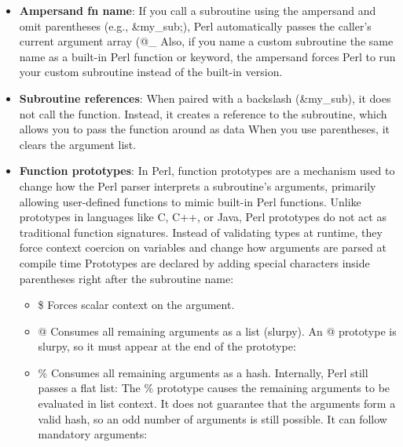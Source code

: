 \documentclass{report}
\begin{document}
\begin{itemize}
        \item \textbf{Ampersand fn name}: If you call a subroutine using the ampersand and omit parentheses (e.g., \&my\_sub;), Perl automatically passes the caller's current argument array (@\_
            \bigbreak \noindent 
            Also, if you name a custom subroutine the same name as a built-in Perl function or keyword, the ampersand forces Perl to run your custom subroutine instead of the built-in version.
        \item \textbf{Subroutine references}: When paired with a backslash (\&my\_sub), it does not call the function. Instead, it creates a reference to the subroutine, which allows you to pass the function around as data
            \bigbreak \noindent 
            When you use parentheses, it clears the argument list.
        \item \textbf{Function prototypes}: In Perl, function prototypes are a mechanism used to change how the Perl parser interprets a subroutine's arguments, primarily allowing user-defined functions to mimic built-in Perl functions.
            \bigbreak \noindent 
            Unlike prototypes in languages like C, C++, or Java, Perl prototypes do not act as traditional function signatures. Instead of validating types at runtime, they force context coercion on variables and change how arguments are parsed at compile time
            \bigbreak \noindent 
            Prototypes are declared by adding special characters inside parentheses right after the subroutine name:
            \begin{itemize}
                \item \$ Forces scalar context on the argument.
                \item @ Consumes all remaining arguments as a list (slurpy).
                    \bigbreak \noindent 
                    An @ prototype is slurpy, so it must appear at the end of the prototype:
                \item \% Consumes all remaining arguments as a hash.
                    \bigbreak \noindent 
                    Internally, Perl still passes a flat list:
                    \bigbreak \noindent 
                    The \% prototype causes the remaining arguments to be evaluated in list context. It does not guarantee that the arguments form a valid hash, so an odd number of arguments is still possible.
                    \bigbreak \noindent 
                    It can follow mandatory arguments:
                    \bigbreak \noindent 
\end{itemize}
\end{itemize}
\end{document}
